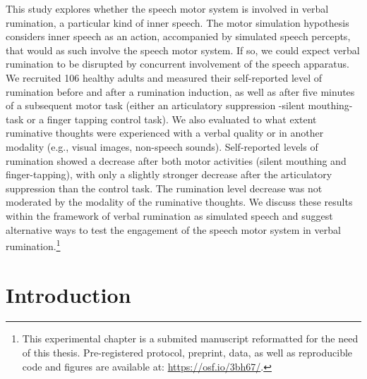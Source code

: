 \documentclass[a4paper,12pt,twoside,onecolumn,openright,final,oldfontcommands]{memoir}
\let\rmarkdownfootnote\footnote%
\def\footnote{\protect\rmarkdownfootnote}
\newcommand{\initial}[1]{
	\lettrine[lines=3,lhang=0.33,nindent=0em]{
		\color{gray}
     		{\textsc{#1}}}{}}
\begin{document}
\initial{T}his study explores whether the speech motor system is involved in verbal rumination, a particular kind of inner speech. The motor simulation hypothesis considers inner speech as an action, accompanied by simulated speech percepts, that would as such involve the speech motor system. If so, we could expect verbal rumination to be disrupted by concurrent involvement of the speech apparatus. We recruited 106 healthy adults and measured their self-reported level of rumination before and after a rumination induction, as well as after five minutes of a subsequent motor task (either an articulatory suppression -silent mouthing- task or a finger tapping control task). We also evaluated to what extent ruminative thoughts were experienced with a verbal quality or in another modality (e.g., visual images, non-speech sounds). Self-reported levels of rumination showed a decrease after both motor activities (silent mouthing and finger-tapping), with only a slightly stronger decrease after the articulatory suppression than the control task. The rumination level decrease was not moderated by the modality of the ruminative thoughts. We discuss these results within the framework of verbal rumination as simulated speech and suggest alternative ways to test the engagement of the speech motor system in verbal rumination.\footnote{This experimental chapter is a submited manuscript reformatted for the need of this thesis. Pre-registered protocol, preprint, data, as well as reproducible code and figures are available at: \url{https://osf.io/3bh67/}.}

\hypertarget{introduction-3}{%
\section{Introduction}\label{introduction-3}}
\end{document}
